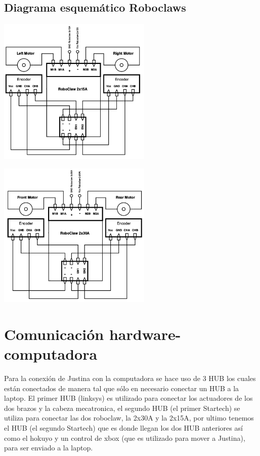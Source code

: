 \documentclass[user_manual.tex]{subfiles}
\begin{document}
\subsection{Diagrama esquemático Roboclaws}

\begin{center}
\includegraphics[width=0.55\textwidth]{Figures/Hardware/Esquematicos/Roboclaw_1.png}
\label{fig:Hardware:Partes:Diagrama:Esquematico:Roboclaw:1}
\end{center}

\begin{center}
\includegraphics[width=0.55\textwidth]{Figures/Hardware/Esquematicos/Roboclaw_2.png}
\label{fig:Hardware:Partes:Diagrama:Esquematico:Roboclaw:2}
\end{center}

\section{Comunicación hardware-computadora}
Para la conexión de Justina con la computadora se hace uso de 3 HUB los cuales están conectados de manera tal que sólo en necesario conectar
un HUB a la laptop. El primer HUB (linksys) es utilizado para conectar los actuadores de los dos brazos y la cabeza mecatronica,
el segundo HUB (el primer Startech) se utiliza para conectar las dos roboclaw, la 2x30A y la 2x15A, por ultimo tenemos el HUB (el segundo 
Startech) que es donde llegan los dos HUB anteriores así como el hokuyo y un control de xbox (que es utilizado para mover a Justina), para
ser enviado a la laptop.\\
\\
\end{document}
